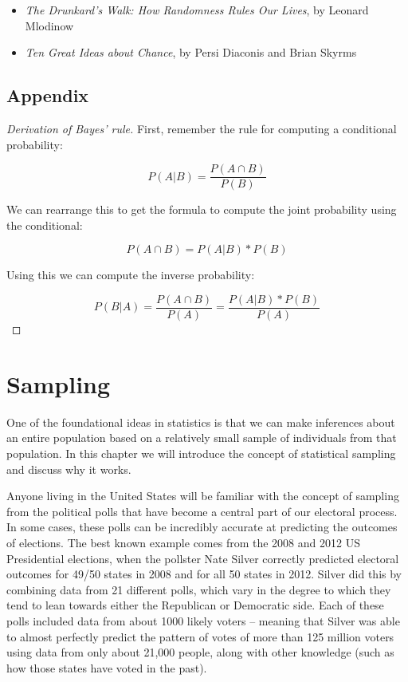\documentclass[12pt,]{book}
\providecommand{\tightlist}{%
  \setlength{\itemsep}{0pt}\setlength{\parskip}{0pt}}
\theoremstyle{definition}
\theoremstyle{definition}
\theoremstyle{definition}
\theoremstyle{remark}
\let\BeginKnitrBlock\begin \let\EndKnitrBlock\end
\begin{document}
\begin{itemize}
\tightlist
\item
  \emph{The Drunkard's Walk: How Randomness Rules Our Lives}, by Leonard Mlodinow
\item
  \emph{Ten Great Ideas about Chance}, by Persi Diaconis and Brian Skyrms
\end{itemize}

\hypertarget{appendix-2}{%
\section{Appendix}\label{appendix-2}}

\BeginKnitrBlock{proof}[Derivation of Bayes' rule]
{}
First, remember the rule for computing a conditional probability:

\[
P(A|B) = \frac{P(A \cap B)}{P(B)}
\]

We can rearrange this to get the formula to compute the joint probability using the conditional:

\[
P(A \cap B) = P(A|B) * P(B)
\]

Using this we can compute the inverse probability:

\[
P(B|A) = \frac{P(A \cap B)}{P(A)} =   \frac{P(A|B)*P(B)}{P(A)}
\]
\EndKnitrBlock{proof}

\hypertarget{sampling}{%
\chapter{Sampling}\label{sampling}}

One of the foundational ideas in statistics is that we can make inferences about an entire population based on a relatively small sample of individuals from that population. In this chapter we will introduce the concept of statistical sampling and discuss why it works.

Anyone living in the United States will be familiar with the concept of sampling from the political polls that have become a central part of our electoral process. In some cases, these polls can be incredibly accurate at predicting the outcomes of elections. The best known example comes from the 2008 and 2012 US Presidential elections, when the pollster Nate Silver correctly predicted electoral outcomes for 49/50 states in 2008 and for all 50 states in 2012. Silver did this by combining data from 21 different polls, which vary in the degree to which they tend to lean towards either the Republican or Democratic side. Each of these polls included data from about 1000 likely voters -- meaning that Silver was able to almost perfectly predict the pattern of votes of more than 125 million voters using data from only about 21,000 people, along with other knowledge (such as how those states have voted in the past).
\end{document}
